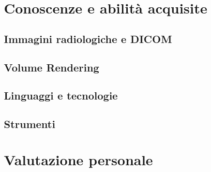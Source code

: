 \section{Conoscenze e abilità acquisite}
\subsection{Immagini radiologiche e DICOM}

\subsection{Volume Rendering}

\subsection{Linguaggi e tecnologie}

\subsection{Strumenti}

\section{Valutazione personale}
